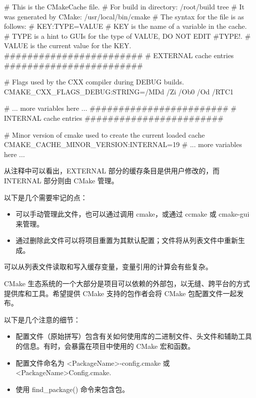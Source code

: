 \begin{shell}
# This is the CMakeCache file.
# For build in directory: /root/build tree
# It was generated by CMake: /usr/local/bin/cmake
# The syntax for the file is as follows:
# KEY:TYPE=VALUE
# KEY is the name of a variable in the cache.
# TYPE is a hint to GUIs for the type of VALUE, DO NOT EDIT
  #TYPE!.
# VALUE is the current value for the KEY.
########################
# EXTERNAL cache entries
########################

# Flags used by the CXX compiler during DEBUG builds.
CMAKE_CXX_FLAGS_DEBUG:STRING=/MDd /Zi /Ob0 /Od /RTC1

# ... more variables here ...
########################
# INTERNAL cache entries
########################

# Minor version of cmake used to create the current loaded cache
CMAKE_CACHE_MINOR_VERSION:INTERNAL=19
# ... more variables here ...
\end{shell}

从注释中可以看出，EXTERNAL 部分的缓存条目是供用户修改的，而 INTERNAL 部分则由 CMake 管理。

以下是几个需要牢记的点：

\begin{itemize}
\item
可以手动管理此文件，也可以通过调用 cmake，或通过 ccmake 或 cmake-gui 来管理。

\item
通过删除此文件可以将项目重置为其默认配置；文件将从列表文件中重新生成。
\end{itemize}

可以从列表文件读取和写入缓存变量，变量引用的计算会有些复杂。


CMake 生态系统的一个大部分是项目可以依赖的外部包，以无缝、跨平台的方式提供库和工具。希望提供 CMake 支持的包作者会将 CMake 包配置文件一起发布。

以下是几个注意的细节：

\begin{itemize}
\item
配置文件（原始拼写）包含有关如何使用库的二进制文件、头文件和辅助工具的信息。有时，会暴露在项目中使用的 CMake 宏和函数。

\item
配置文件命名为 <PackageName>-config.cmake 或 <PackageName>Config.cmake.

\item
使用 find\_package() 命令来包含包。
\end{itemize}

